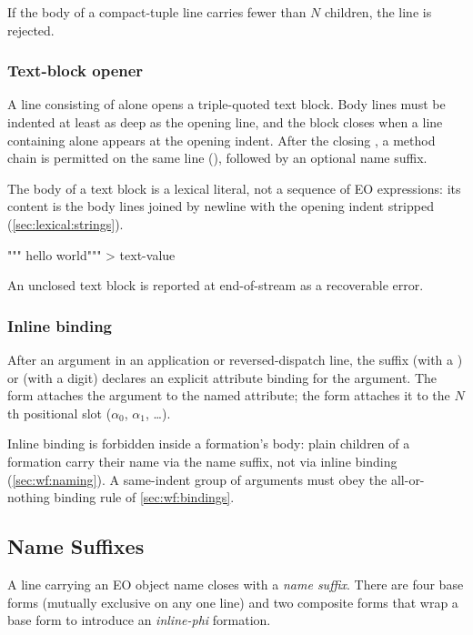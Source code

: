 If the body of a compact-tuple line carries fewer than \(N\) children,
  the line is rejected.

\subsubsection{Text-block opener}\label{sec:syntax:text}

A line consisting of  alone opens a triple-quoted text block.
Body lines must be indented at least as deep as the opening line, and
  the block closes when a line containing  alone appears at the
  opening indent.
After the closing , a method chain is permitted on the same line
  (), followed by an optional name suffix.

The body of a text block is a lexical literal, not a sequence of EO
  expressions: its content is the body lines joined by newline with the
  opening indent stripped (\cref{sec:lexical:strings}).

\begin{ffcode}
"""
hello
world""" > text-value
\end{ffcode}

An unclosed text block is reported at end-of-stream as a recoverable error.

\subsubsection{Inline binding}\label{sec:syntax:binding}

After an argument in an application or reversed-dispatch line, the suffix
   (with  a ) or  (with  a digit)
  declares an explicit attribute binding for the argument.
The form  attaches the argument to the named attribute;
  the form  attaches it to the \(N\)th positional slot
  (\(\alpha_0\), \(\alpha_1\), \ldots).

Inline binding is forbidden inside a formation's body:
  plain children of a formation carry their name via the name suffix,
  not via inline binding (\cref{sec:wf:naming}).
A same-indent group of arguments must obey the all-or-nothing binding rule
  of \cref{sec:wf:bindings}.

\subsection{Name Suffixes}\label{sec:syntax:names}

A line carrying an EO object name closes with a \emph{name suffix}.
There are four base forms (mutually exclusive on any one line)
  and two composite forms that wrap a base form to introduce an
  \emph{inline-phi} formation.


